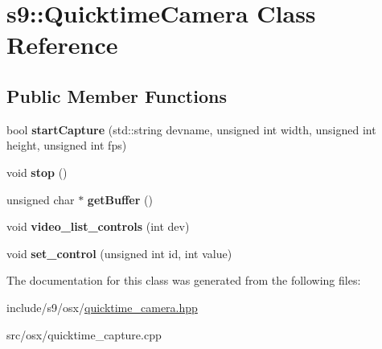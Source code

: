 \hypertarget{classs9_1_1QuicktimeCamera}{\section{s9\-:\-:Quicktime\-Camera Class Reference}
\label{classs9_1_1QuicktimeCamera}
}
\subsection*{Public Member Functions}
\begin{DoxyCompactItemize}
\item 
\hypertarget{classs9_1_1QuicktimeCamera_a5197756dd0a9546ffd3c6cc71db20ff0}{bool {\bfseries start\-Capture} (std\-::string devname, unsigned int width, unsigned int height, unsigned int fps)}\label{classs9_1_1QuicktimeCamera_a5197756dd0a9546ffd3c6cc71db20ff0}

\item 
\hypertarget{classs9_1_1QuicktimeCamera_ab51ba5fdf5594b0eb7bce5426a2d9961}{void {\bfseries stop} ()}\label{classs9_1_1QuicktimeCamera_ab51ba5fdf5594b0eb7bce5426a2d9961}

\item 
\hypertarget{classs9_1_1QuicktimeCamera_a44ecb32ada15b8f59d26da29e2db38d6}{unsigned char $\ast$ {\bfseries get\-Buffer} ()}\label{classs9_1_1QuicktimeCamera_a44ecb32ada15b8f59d26da29e2db38d6}

\item 
\hypertarget{classs9_1_1QuicktimeCamera_a7b1eaae3c1a9e12fd4cb77283caa9650}{void {\bfseries video\-\_\-list\-\_\-controls} (int dev)}\label{classs9_1_1QuicktimeCamera_a7b1eaae3c1a9e12fd4cb77283caa9650}

\item 
\hypertarget{classs9_1_1QuicktimeCamera_aed4ce05bafb61cbe74341131cb4de85b}{void {\bfseries set\-\_\-control} (unsigned int id, int value)}\label{classs9_1_1QuicktimeCamera_aed4ce05bafb61cbe74341131cb4de85b}

\end{DoxyCompactItemize}


The documentation for this class was generated from the following files\-:\begin{DoxyCompactItemize}
\item 
include/s9/osx/\hyperlink{quicktime__camera_8hpp}{quicktime\-\_\-camera.\-hpp}\item 
src/osx/quicktime\-\_\-capture.\-cpp\end{DoxyCompactItemize}
